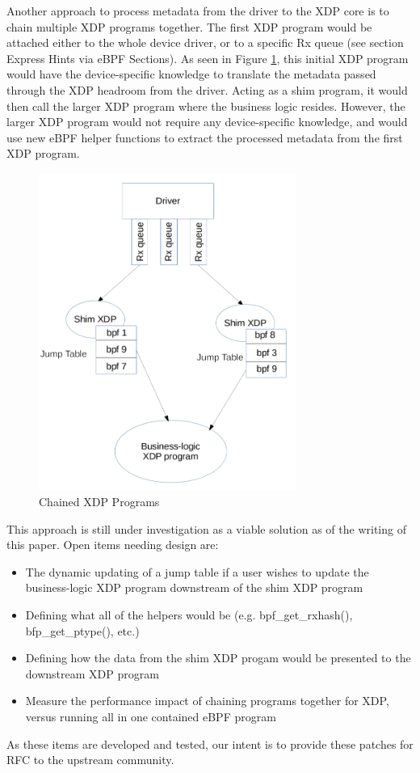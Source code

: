 \documentclass[letterpaper]{article}
\begin{document}
Another approach to process metadata from the driver to the XDP core is to chain multiple XDP programs together. The first XDP program would be attached either to the whole device driver, or to a specific Rx queue (see section Express Hints via eBPF Sections). As seen in Figure \ref{xdp-chained-programs}, this initial XDP program would have the device-specific knowledge to translate the metadata passed through the XDP headroom from the driver. Acting as a shim program, it would then call the larger XDP program where the business logic resides. However, the larger XDP program would not require any device-specific knowledge, and would use new eBPF helper functions to extract the processed metadata from the first XDP program.

\begin{figure}[h]
\includegraphics[width=3.31in]{xdp-chained-programs.png}
\caption{Chained XDP Programs}
\label{xdp-chained-programs}
\end{figure}

\indent This approach is still under investigation as a viable solution as of the writing of this paper. Open items needing design are:
\begin{itemize}
\item The dynamic updating of a jump table if a user wishes to update the business-logic XDP program downstream of the shim XDP program
\item Defining what all of the helpers would be (e.g. bpf\_get\_rxhash(), bfp\_get\_ptype(), etc.)
\item Defining how the data from the shim XDP progam would be presented to the downstream XDP program
\item Measure the performance impact of chaining programs together for XDP, versus running all in one contained eBPF program
\end{itemize}
As these items are developed and tested, our intent is to provide these patches for RFC to the upstream community.
\end{document}
